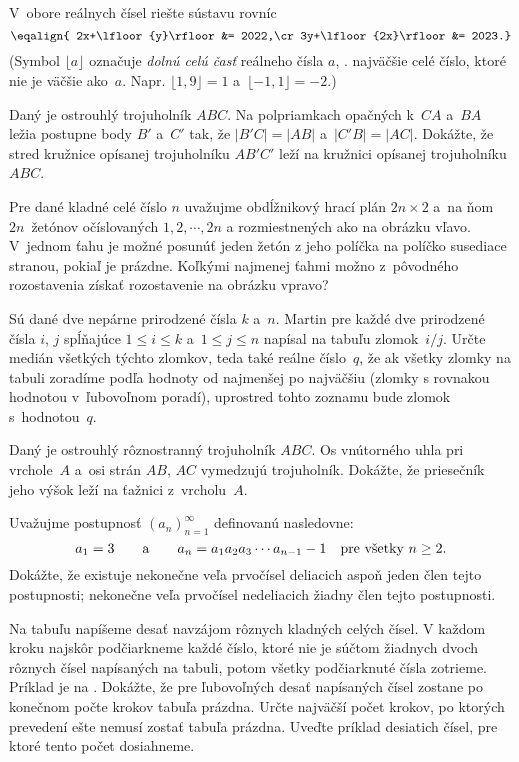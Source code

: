 ﻿{%
V~obore reálnych čísel riešte sústavu rovníc
$$\eqalign{ 2x+\lfloor{y}\rfloor &= 2022,\cr
3y+\lfloor{2x}\rfloor &= 2023.}
$$
(Symbol $\lfloor{a}\rfloor$ označuje \emph{dolnú celú časť} reálneho čísla $a$, \tj.
najväčšie celé číslo, ktoré nie je väčšie ako~$a$.
Napr. $\lfloor{1{,}9}\rfloor=1$ a~$\lfloor{-1{,}1}\rfloor=-2$.)
}

{%
Daný je ostrouhlý trojuholník $ABC$.
Na polpriamkach opačných k~$CA$ a~$BA$ ležia postupne body $B'$ a~$C'$ tak, že
$|B'C|=|AB|$ a~$|C'B|=|AC|$.
Dokážte, že stred kružnice opísanej trojuholníku $AB'C'$ leží na kružnici opísanej trojuholníku $ABC$.
}

{%
Pre dané kladné celé číslo $n$ uvažujme obdĺžnikový hrací plán $2n\times 2$
a~na ňom $2n$~žetónov očíslovaných $1,2,\cdots,2n$ a rozmiestnených ako na obrázku vľavo.
V~jednom ťahu je možné posunúť jeden žetón z jeho políčka na políčko susediace stranou, pokiaľ je prázdne.
Koľkými najmenej ťahmi možno z~pôvodného rozostavenia získať rozostavenie na obrázku vpravo?
}

{%
Sú dané dve nepárne prirodzené čísla $k$ a~$n$.
Martin pre každé dve prirodzené čísla $i$, $j$ spĺňajúce $1\le i\leq k$ a~$1\le j \leq n$ napísal na tabuľu zlomok~$i/j$.
Určte medián všetkých týchto zlomkov, teda také reálne číslo~$q$, že
ak všetky zlomky na tabuli zoradíme podľa hodnoty od najmenšej po najväčšiu
(zlomky s rovnakou hodnotou v~ľubovoľnom poradí),
uprostred tohto zoznamu bude zlomok s~hodnotou~$q$.
}

{%
Daný je ostrouhlý rôznostranný trojuholník $ABC$.
Os vnútorného uhla pri vrchole~$A$ a~osi strán $AB$, $AC$ vymedzujú trojuholník.
Dokážte, že priesečník jeho výšok leží na ťažnici z~vrcholu~$A$.}

{%
Uvažujme postupnosť $(a_n)_{n=1}^\infty$ definovanú nasledovne:
$$
a_1=3 \qquad\hbox{a}\qquad a_n=a_1a_2a_3\cdots a_{n-1}-1\quad\text{pre všetky $n\ge 2$}.
$$
Dokážte, že existuje
 nekonečne veľa prvočísel deliacich aspoň jeden člen tejto postupnosti;
 nekonečne veľa prvočísel nedeliacich žiadny člen tejto postupnosti.
}

{%
Na tabuľu napíšeme desať navzájom rôznych kladných celých čísel.
V každom kroku najskôr podčiarkneme každé číslo, ktoré nie je súčtom žiadnych dvoch rôznych čísel napísaných na tabuli, potom všetky podčiarknuté čísla zotrieme. Príklad je na \obr{}.
%
 Dokážte, že pre ľubovoľných desať napísaných čísel zostane po konečnom počte krokov tabuľa prázdna.
 Určte najväčší počet krokov, po ktorých prevedení ešte nemusí zostať tabuľa prázdna. Uveďte príklad desiatich čísel, pre ktoré tento počet dosiahneme.\endgraf\noindent}

